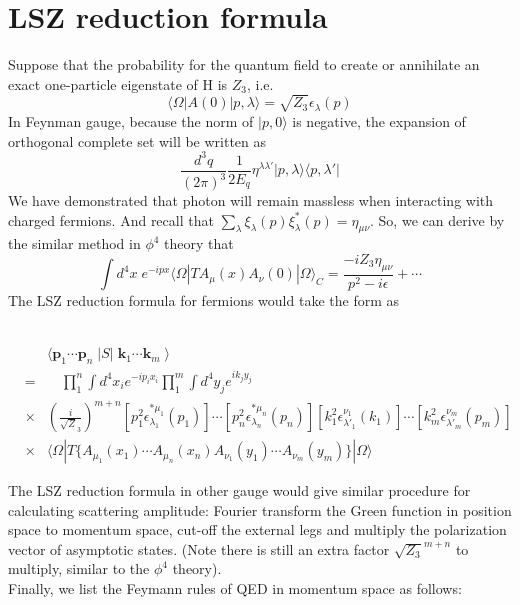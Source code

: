 \section{LSZ reduction formula}
\noindent
Suppose that the probability for the quantum field to create or annihilate an exact one-particle eigenstate of H is $Z_3$, i.e.
\[\langle \Omega | A(0) | p,\lambda \rangle = \sqrt{Z_3} \epsilon_{\lambda}(p)\]
In Feynman gauge, because the norm of $|p,0\rangle$ is negative, the expansion of orthogonal complete set will be written as
\[\frac{d^3q}{(2\pi)^3} \frac{1}{2E_q} \eta^{\lambda\lambda'} | p,\lambda\rangle\langle p, \lambda' |\]
We have demonstrated that photon will remain massless when interacting with charged fermions. And recall that $\sum_{\lambda}\xi_{\lambda}(p)\xi^{*}_{\lambda}(p) = \eta_{\mu\nu}$. So, we can derive by the similar method in $\phi^4$ theory that
\[\int d^4x \; e^{-ipx} \langle \Omega | T A_{\mu}(x) A_{\nu}(0) | \Omega \rangle_C = \frac{-iZ_3\eta_{\mu\nu}}{p^2-i\epsilon} + \cdots \]
The LSZ reduction formula for fermions would take the form as \\ \\
\begin{newthem}
\begin{eqnarray}
&\phantom{=}& \langle \bm{p}_1 \cdots \bm{p}_n \; | S | \; \bm{k}_1 \cdots \bm{k}_m \; \rangle  
\nonumber \\
&=& \quad \prod_1^n \int d^4 x_i e^{-i p_ix_i } \prod_1^m \int d^4 y_j e^{ik_jy_j} 
\nonumber \\
&\times & \left( \frac{i}{\sqrt{Z}_3} \right) ^{m+n}  [p_1^2 \epsilon^{*\mu_1}_{\lambda_1}(p_1)] \cdots [p_n^2 \epsilon^{*\mu_n}_{\lambda_n}(p_n)] [k_1^2 \epsilon^{ \nu_1}_{\lambda'_1}(k_1)] \cdots [k_m^2 \epsilon^{ \nu_m}_{\lambda'_m}(p_m)]
\nonumber \\
&\times & \langle \Omega | T \{A_{\mu_1}(x_1) \cdots A_{\mu_n}(x_n)
A_{\nu_1}(y_1) \cdots A_{\nu_m}(y_m) \} | \Omega \rangle
\nonumber
\end{eqnarray}
\end{newthem}
The LSZ reduction formula in other gauge would give similar procedure for calculating scattering amplitude: Fourier transform the Green function in position space to momentum space, cut-off the external legs and multiply the polarization vector of asymptotic states. (Note there is still an extra factor $\sqrt{Z_3}^{m+n}$ to multiply, similar to the $\phi^4$ theory).\\
Finally, we list the Feymann rules of QED in momentum space as follows:
